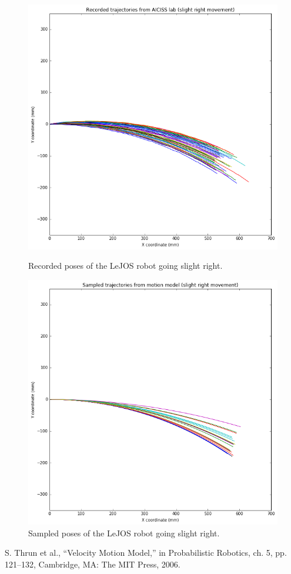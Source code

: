 \documentclass[paper=a4, fontsize=11pt]{scrartcl} %
\begin{document}
    \begin{figure}[h!]
		\centering
		\begin{minipage}{0.45\textwidth}
			\centering
			\includegraphics[width=1\textwidth]{images/recorded_poses_slight_right.png} %
			\caption{Recorded poses of the LeJOS robot going slight right.}
		\end{minipage}\hfill
		\begin{minipage}{0.45\textwidth}
			\centering
			\includegraphics[width=1\textwidth]{images/sampled_poses_slightRight.png} %
			\caption{Sampled poses of the LeJOS robot going slight right.}
		\end{minipage}
	\end{figure}
    
    \begin{thebibliography}{9}
    	S. Thrun et al., “Velocity Motion Model,” in Probabilistic Robotics, ch. 5, pp. 121–132, Cambridge,
    	MA: The MIT Press, 2006.
    \end{thebibliography}
\end{document}

